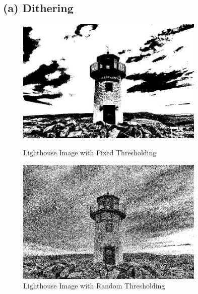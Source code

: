 \documentclass[12pt]{article}
\begin{document}
\subsection*{(a) Dithering}
\begin{figure}[H]
	\centering 
	\begin{minipage}[b]{0.45\textwidth} 
		\centering
		\includegraphics[width=0.8\textwidth]{Lighthouse_fixed}
		\caption{Lighthouse Image with Fixed Thresholding}
		\label{LighthouseFixed}
	\end{minipage}
	\begin{minipage}[b]{0.45\textwidth} 
		\centering 
		\includegraphics[width=0.8\textwidth]{Lighthouse_random}
		\caption{Lighthouse Image with Random Thresholding}
		\label{LighthouseRandom}
	\end{minipage}
\end{figure}
\end{document}
